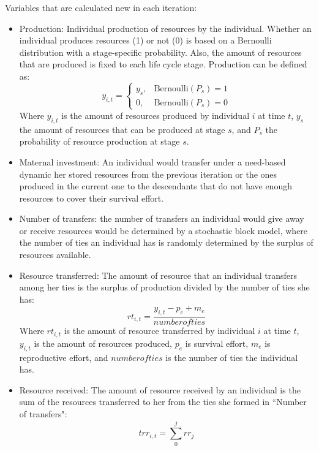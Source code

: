 \documentclass{article}
\begin{document}
Variables that are calculated new in each iteration:
    \begin{itemize}
        \item Production: Individual production of resources by the individual. Whether an individual produces resources (1) or not (0) is based on a Bernoulli distribution with a stage-specific probability. Also, the amount of resources that are produced is fixed to each life cycle stage. Production can be defined as:
\begin{equation}
    y_{i,t}=\begin{cases}
    y_s,& \text{Bernoulli}(P_s)=1\\
    0,& \text{Bernoulli}(P_s)=0
\end{cases}
\end{equation}
        Where $y_{i,t}$ is the amount of resources produced by individual $i$ at time $t$, $y_{s}$ the amount of resources that can be produced at stage $s$, and $P_{s}$ the probability of resource production at stage $s$.
        \item Maternal investment: An individual would transfer under a need-based dynamic her stored resources from the previous iteration or the ones produced in the current one to the descendants that do not have enough resources to cover their survival effort.
        \item Number of transfers: the number of transfers an individual would give away or receive resources would be determined by a stochastic block model, where the number of ties an individual has is randomly determined by the surplus of resources available.
        \item Resource transferred: The amount of resource that an individual transfers among her ties is the surplus of production divided by the number of ties she has:
\begin{equation}
    rt_{i,t}=\frac{y_{i,t}-p_e+m_e}{number of ties}        
\end{equation}
        Where $rt_{i,t}$ is the amount of resource transferred by individual $i$ at time $t$, $y_{i,t}$ is the amount of resources produced, $p_e$ is survival effort, $m_e$ is reproductive effort, and $number of ties$ is the number of ties the individual has.
        \item Resource received: The amount of resource received by an individual is the sum of the resources transferred to her from the ties she formed in ``Number of transfers":
\begin{equation}
    trr_{i,t}=\sum_0^j rr_j        

\end{equation}
\end{itemize}
\end{document}
